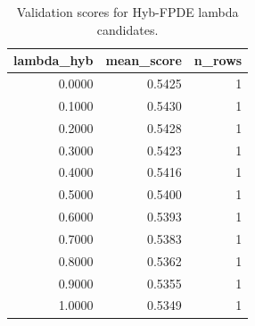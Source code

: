 \begin{table}[t]
\caption{Validation scores for Hyb-FPDE lambda candidates.}
\label{tab:lambda_distribution_computed}
\centering
\begin{tabular}{rrr}
\toprule
lambda\_hyb & mean\_score & n\_rows \\
\midrule
0.0000 & 0.5425 & 1 \\
0.1000 & 0.5430 & 1 \\
0.2000 & 0.5428 & 1 \\
0.3000 & 0.5423 & 1 \\
0.4000 & 0.5416 & 1 \\
0.5000 & 0.5400 & 1 \\
0.6000 & 0.5393 & 1 \\
0.7000 & 0.5383 & 1 \\
0.8000 & 0.5362 & 1 \\
0.9000 & 0.5355 & 1 \\
1.0000 & 0.5349 & 1 \\
\bottomrule
\end{tabular}

\end{table}
